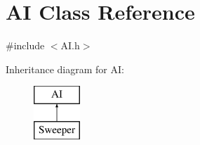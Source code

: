 \hypertarget{class_a_i}{}\section{AI Class Reference}
\label{class_a_i}


{\ttfamily \#include $<$A\+I.\+h$>$}

Inheritance diagram for AI\+:\begin{figure}[H]
\begin{center}
\leavevmode
\includegraphics[height=2.000000cm]{class_a_i}
\end{center}
\end{figure}
